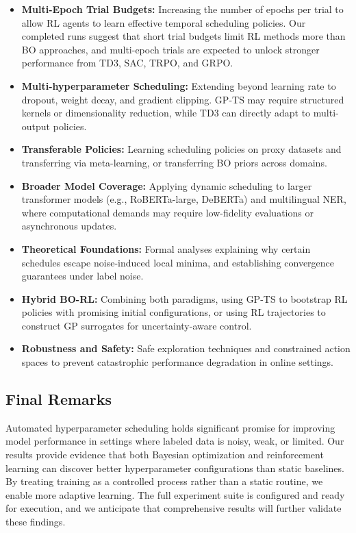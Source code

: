 \documentclass[11pt]{article}
\begin{document}
\begin{itemize}
    \item \textbf{Multi-Epoch Trial Budgets:} Increasing the number of epochs per trial to allow RL agents to learn effective temporal scheduling policies. Our completed runs suggest that short trial budgets limit RL methods more than BO approaches, and multi-epoch trials are expected to unlock stronger performance from TD3, SAC, TRPO, and GRPO.
    \item \textbf{Multi-hyperparameter Scheduling:} Extending beyond learning rate to dropout, weight decay, and gradient clipping. GP-TS may require structured kernels or dimensionality reduction, while TD3 can directly adapt to multi-output policies.
    \item \textbf{Transferable Policies:} Learning scheduling policies on proxy datasets and transferring via meta-learning, or transferring BO priors across domains.
    \item \textbf{Broader Model Coverage:} Applying dynamic scheduling to larger transformer models (e.g., RoBERTa-large, DeBERTa) and multilingual NER, where computational demands may require low-fidelity evaluations or asynchronous updates.
    \item \textbf{Theoretical Foundations:} Formal analyses explaining why certain schedules escape noise-induced local minima, and establishing convergence guarantees under label noise.
    \item \textbf{Hybrid BO-RL:} Combining both paradigms, using GP-TS to bootstrap RL policies with promising initial configurations, or using RL trajectories to construct GP surrogates for uncertainty-aware control.
    \item \textbf{Robustness and Safety:} Safe exploration techniques and constrained action spaces to prevent catastrophic performance degradation in online settings.
\end{itemize}

\subsection*{Final Remarks}
Automated hyperparameter scheduling holds significant promise for improving model performance in settings where labeled data is noisy, weak, or limited. Our results provide evidence that both Bayesian optimization and reinforcement learning can discover better hyperparameter configurations than static baselines. By treating training as a controlled process rather than a static routine, we enable more adaptive learning. The full experiment suite is configured and ready for execution, and we anticipate that comprehensive results will further validate these findings.
\end{document}
